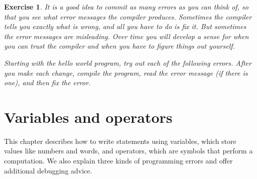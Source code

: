 \documentclass[12pt]{book}
\theoremstyle{exercise}
\newtheorem{exercise}{Exercise}[chapter]
\newcommand{\java}{\verb}%}
\begin{document}
\begin{exercise}

It is a good idea to commit as many errors as you can think of, so that you see what error messages the compiler produces.
Sometimes the compiler tells you exactly what is wrong, and all you have to do is fix it.
But sometimes the error messages are misleading.
Over time you will develop a sense for when you can trust the compiler and when you have to figure things out yourself.

Starting with the hello world program, try out each of the following errors.
After you make each change, compile the program, read the error message (if there is one), and then fix the error.



\end{exercise}


\chapter{Variables and operators}

This chapter describes how to write statements using variables, which store values like numbers and words, and operators, which are symbols that perform a computation.
We also explain three kinds of programming errors and offer additional debugging advice.
\end{document}
